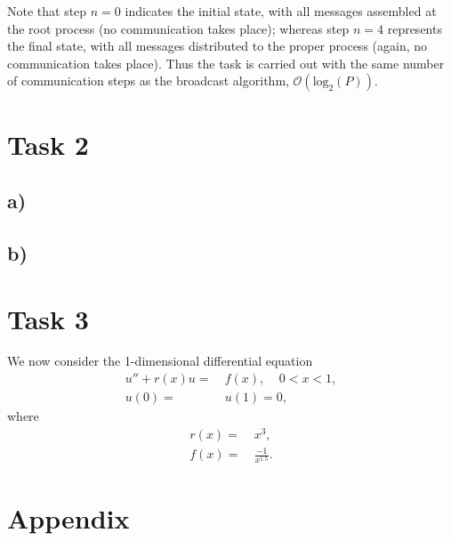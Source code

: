 \documentclass[a4paper,11pt]{article}
\newcommand{\ba}[1]{\begin{align*}    #1    \end{align*}}
\begin{document}
Note that step $n=0$ indicates the initial state, with all messages assembled at the root process (no communication takes place); whereas step $n=4$ represents the final state, with all messages distributed to the proper process (again, no communication takes place).  Thus the task is carried out with the same number of communication steps as the broadcast algorithm, $\mathcal{O}(\text{log}_2(P))$.
 
\section*{Task 2}
\subsection*{a)}
\subsection*{b)}

\section*{Task 3}

We now consider the 1-dimensional differential equation
\ba{
u'' + r(x)u = & \ f(x), \ \ \ \ \ 0<x<1,\\
u(0) = & \  u(1) = 0,
}
where
\ba{
r(x) = & \ x^3,\\
f(x) = & \ \frac{-1}{x^{1.5}}.
}


\section*{Appendix}
\begin{lstlisting}[style=customc]
\end{lstlisting}
\end{document}
